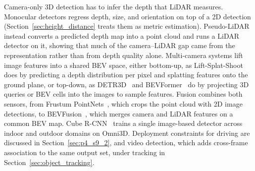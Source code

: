 Camera-only 3D detection has to infer the depth that LiDAR measures. Monocular detectors regress depth, size, and orientation on top of a 2D detection (Section~\ref{sec:height_distance} treats them as metric estimation). Pseudo-LiDAR~\cite{wang2019pseudolidar} instead converts a predicted depth map into a point cloud and runs a LiDAR detector on it, showing that much of the camera--LiDAR gap came from the representation rather than from depth quality alone. Multi-camera systems lift image features into a shared BEV space, either bottom-up, as Lift-Splat-Shoot~\cite{philion2020lss} does by predicting a depth distribution per pixel and splatting features onto the ground plane, or top-down, as DETR3D~\cite{wang2022detr3d} and BEVFormer~\cite{LiWLXSLQD22} do by projecting 3D queries or BEV cells into the images to sample features. Fusion combines both sensors, from Frustum PointNets~\cite{qi2018frustum}, which crops the point cloud with 2D image detections, to BEVFusion~\cite{liu2023bevfusion}, which merges camera and LiDAR features on a common BEV map. Cube R-CNN~\cite{Omni3D-Brazil0SR0G23} trains a single image-based detector across indoor and outdoor domains on Omni3D. Deployment constraints for driving are discussed in Section~\ref{sec:p4_s9_2}, and video detection, which adds cross-frame association to the same output set, under tracking in Section~\ref{sec:object_tracking}.

